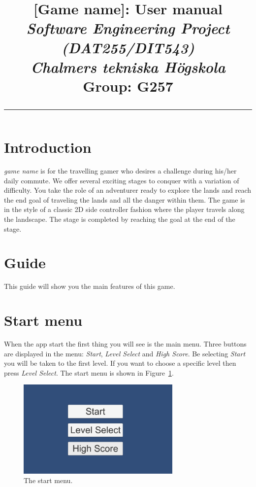 \documentclass[12pt, a4paper]{article}
\title{
    \begin{flushleft}
        {\huge [Game name]: \textbf{User manual}} \\
        \vspace{0.5cm}
        \large\emph{Software Engineering Project (DAT255/DIT543)} \\
        \large\emph{Chalmers tekniska Högskola} \\
        \vspace{0.5cm}
        Group: G257 \\
        \vspace{0.5cm}
        {\rule{\linewidth}{0.5mm}}
        \end{flushleft}
        \vspace{1cm}
}
\author{}
\date{}
\begin{document}
\maketitle

\section{Introduction}
\textit{game name} is for the travelling gamer who desires a challenge during his/her daily commute. We offer several exciting stages to conquer with a variation of difficulty. You take the role of an adventurer ready to explore the lands and reach the end goal of traveling the lands and all the danger within them. The game is in the style of a classic 2D side controller fashion where the player travels along the landscape. The stage is completed by reaching the goal at the end of the stage.

\newpage

\section{Guide}
This guide will show you the main features of this game.

\section{Start menu}
When the app start the first thing you will see is the main menu. Three buttons are displayed in the menu: \textit{Start}, \textit{Level Select} and \textit{High Score}. Be selecting \textit{Start} you will be taken to the first level. If you want to choose a specific level then press \textit{Level Select}. The start menu is shown in Figure~\ref{fig:startmenu}.

\begin{figure}[ht!]
    \centering
    \includegraphics[width=8cm]{startmenu.jpg}
    \caption{The start menu.}
    \label{fig:startmenu}
\end{figure}
\end{document}
